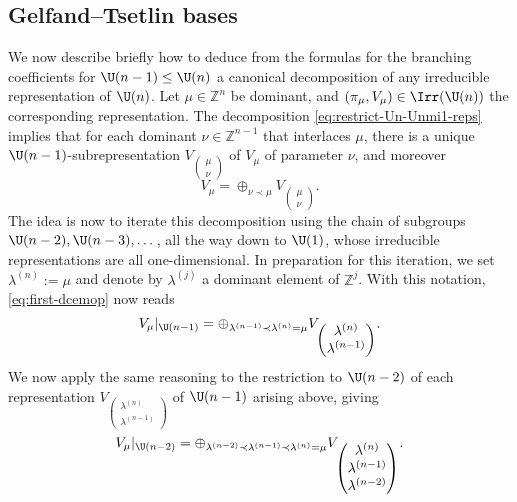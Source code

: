 \documentclass[reqno]{amsart} 
\begin{document}
\subsection{Gelfand--Tsetlin bases}
We now describe briefly how to deduce from the formulas for the branching coefficients for $\U(n-1) \leq \U(n)$ a canonical decomposition of any irreducible representation of $\U(n)$.  Let $\mu \in \mathbb{Z}^n$ be dominant, and $(\pi_\mu,V_\mu) \in \Irr(\U(n))$ the corresponding representation.  The decomposition \eqref{eq:restrict-Un-Unmi1-reps} implies that for each dominant $\nu \in \mathbb{Z}^{n-1}$ that interlaces $\mu$, there is a unique $\U(n-1)$-subrepresentation $V _{
\begin{pmatrix}
    \mu   \\
    \nu
  \end{pmatrix}
}$ of $V_{\mu}$ of parameter $\nu$, and moreover
\begin{equation}\label{eq:first-dcemop}
  V_\mu = \oplus_{\nu \prec \mu} V _{
\begin{pmatrix}
      \mu   \\
      \nu 
    \end{pmatrix}
}.
\end{equation}
The idea is now to iterate this decomposition using the chain of subgroups $\U(n-2), \U(n-3), \dotsc$, all the way down to $\U(1)$, whose irreducible representations are all one-dimensional.  In preparation for this iteration, we set $\lambda^{(n)} := \mu$ and denote by $\lambda^{(j)}$ a dominant element of $\mathbb{Z}^{j}$.  With this notation, \eqref{eq:first-dcemop} now reads
\begin{equation}\label{eq:}
  V_\mu |_{\U(n-1)}
  =
  \oplus_{\lambda^{(n-1)} \prec \lambda^{(n)} = \mu }
  V _{
\begin{pmatrix}
      \lambda^{(n)}  \\
      \lambda^{(n-1)}
    \end{pmatrix}
  }.
\end{equation}
We now apply the same reasoning to the restriction to $\U(n-2)$ of each representation $V _{
\begin{pmatrix}
    \lambda^{(n)}  \\
    \lambda^{(n-1)}
  \end{pmatrix}
}$ of $\U(n-1)$ arising above, giving
\begin{equation}\label{eq:}
  V_\mu |_{\U(n-2)}
  =
  \oplus_{\lambda^{(n-2)} \prec \lambda^{(n-1)} \prec \lambda^{(n)} = \mu }
  V _{
\begin{pmatrix}
      \lambda^{(n)}  \\
      \lambda^{(n-1)} \\
      \lambda^{(n-2)}
    \end{pmatrix}
  }.
\end{equation}
\end{document}
